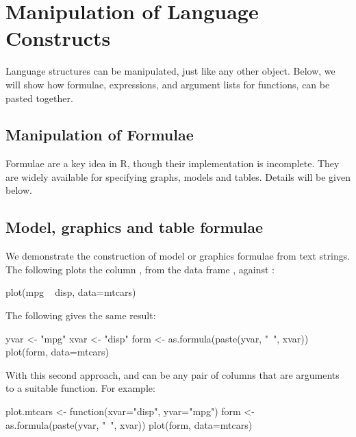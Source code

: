 






\section{Manipulation of Language Constructs}

Language structures can be manipulated, just like any other object.
Below, we will show how formulae, expressions, and argument lists
for functions, can be pasted together.

\subsection{Manipulation of Formulae}

Formulae are a key idea in R, though their implementation is
incomplete. They are widely available for specifying graphs,
models and tables. Details will be given below.

\subsection*{Model, graphics and table formulae}
We demonstrate the construction of model or graphics formulae from
text strings. The following plots the column , from the data
frame , against :
\begin{Schunk}
\begin{Sinput}
plot(mpg ~ disp, data=mtcars)
\end{Sinput}
\end{Schunk}
The following gives the same result:
\begin{Schunk}
\begin{Sinput}
yvar <- "mpg"
xvar <- "disp"
form <- as.formula(paste(yvar, "~", xvar))
plot(form, data=mtcars)
\end{Sinput}
\end{Schunk}
With this second approach,  and
 can be any pair of columns that are arguments 
to a suitable function.  For example:
\begin{Schunk}
\begin{Sinput}
plot.mtcars <- function(xvar="disp", yvar="mpg"){
    form <- as.formula(paste(yvar, "~", xvar))
    plot(form, data=mtcars)
}
\end{Sinput}
\end{Schunk}

